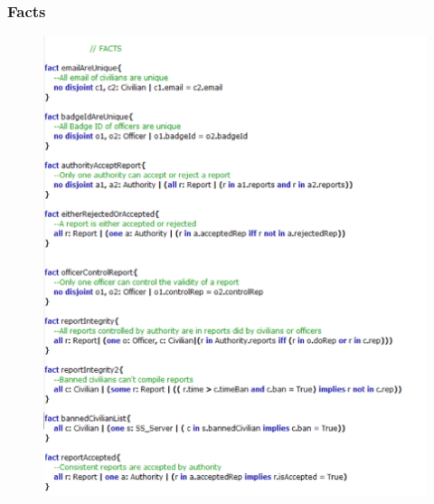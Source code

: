 \documentclass[12pt,a4paper]{article}
\begin{document}
\subsubsection{Facts}

\begin{figure}[H]
				\centering
				\includegraphics[width=.75\paperwidth,height=.75\paperheight, keepaspectratio]{Images/Alloy/facts1}
\end{figure}
\end{document}
